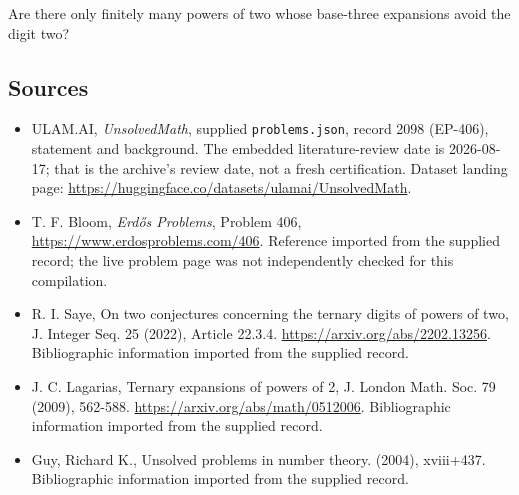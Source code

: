 \documentclass[11pt,a4paper]{article}
\begin{document}
Are there only finitely many powers of two whose base-three expansions avoid the digit two?

\subsection{Sources}

{\small

\begin{itemize}

\item[\hypertarget{source:2098:1}{S1}] ULAM.AI, \emph{UnsolvedMath}, supplied \texttt{problems.json}, record 2098 (EP-406), statement and background. The embedded literature-review date is 2026-08-17; that is the archive’s review date, not a fresh certification. Dataset landing page: \url{https://huggingface.co/datasets/ulamai/UnsolvedMath}.

\item[\hypertarget{source:2098:2}{S2}] T. F. Bloom, \emph{Erdős Problems}, Problem 406, \url{https://www.erdosproblems.com/406}. Reference imported from the supplied record; the live problem page was not independently checked for this compilation.

\item[\hypertarget{source:2098:3}{S3}] R. I. Saye, On two conjectures concerning the ternary digits of powers of two, J. Integer Seq. 25 (2022), Article 22.3.4. \url{https://arxiv.org/abs/2202.13256}. Bibliographic information imported from the supplied record.

\item[\hypertarget{source:2098:4}{S4}] J. C. Lagarias, Ternary expansions of powers of 2, J. London Math. Soc. 79 (2009), 562-588. \url{https://arxiv.org/abs/math/0512006}. Bibliographic information imported from the supplied record.

\item[\hypertarget{source:2098:5}{S5}] Guy, Richard K., Unsolved problems in number theory. (2004), xviii+437. Bibliographic information imported from the supplied record.

\end{itemize}

}

\label{end:2098}
\end{document}
